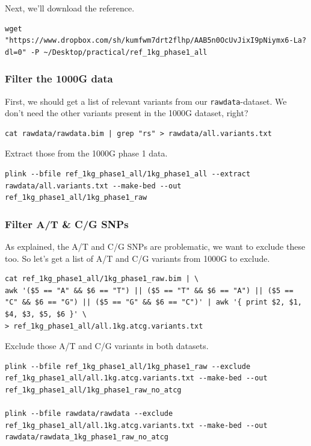 \documentclass[
]{book}
\newcommand{\passthrough}[1]{#1}
\begin{document}
Next, we'll download the reference.

\begin{lstlisting}
wget "https://www.dropbox.com/sh/kumfwm7drt2flhp/AAB5n0OcUvJixI9pNiymx6-La?dl=0" -P ~/Desktop/practical/ref_1kg_phase1_all
\end{lstlisting}

\hypertarget{filter-the-1000g-data}{%
\subsubsection{Filter the 1000G data}\label{filter-the-1000g-data}}

First, we should get a list of relevant variants from our \passthrough{\lstinline!rawdata!}-dataset. We don't need the other variants present in the 1000G dataset, right?

\begin{lstlisting}
cat rawdata/rawdata.bim | grep "rs" > rawdata/all.variants.txt
\end{lstlisting}

Extract those from the 1000G phase 1 data.

\begin{lstlisting}
plink --bfile ref_1kg_phase1_all/1kg_phase1_all --extract rawdata/all.variants.txt --make-bed --out ref_1kg_phase1_all/1kg_phase1_raw
\end{lstlisting}

\hypertarget{filter-at-cg-snps}{%
\subsubsection{Filter A/T \& C/G SNPs}\label{filter-at-cg-snps}}

As explained, the A/T and C/G SNPs are problematic, we want to exclude these too. So let's get a list of A/T and C/G variants from 1000G to exclude.

\begin{lstlisting}
cat ref_1kg_phase1_all/1kg_phase1_raw.bim | \
awk '($5 == "A" && $6 == "T") || ($5 == "T" && $6 == "A") || ($5 == "C" && $6 == "G") || ($5 == "G" && $6 == "C")' | awk '{ print $2, $1, $4, $3, $5, $6 }' \
> ref_1kg_phase1_all/all.1kg.atcg.variants.txt
\end{lstlisting}

Exclude those A/T and C/G variants in both datasets.

\begin{lstlisting}
plink --bfile ref_1kg_phase1_all/1kg_phase1_raw --exclude ref_1kg_phase1_all/all.1kg.atcg.variants.txt --make-bed --out ref_1kg_phase1_all/1kg_phase1_raw_no_atcg

plink --bfile rawdata/rawdata --exclude ref_1kg_phase1_all/all.1kg.atcg.variants.txt --make-bed --out rawdata/rawdata_1kg_phase1_raw_no_atcg
\end{lstlisting}
\end{document}
